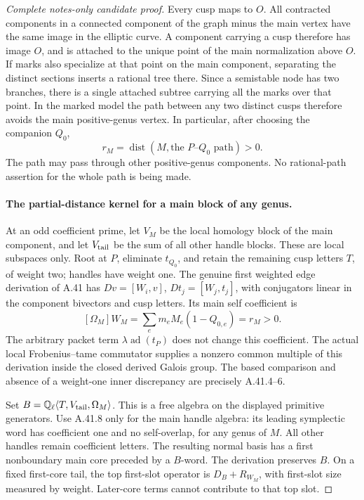 \begin{proof}[Complete notes-only candidate proof]
Every cusp maps to \(O\). All contracted components in a connected
component of the graph minus the main vertex have the same image
in the elliptic curve. A component carrying a cusp therefore has
image \(O\), and is attached to the unique point of the main
normalization above \(O\). If marks also specialize at that point
on the main component, separating the distinct sections inserts
a rational tree there. Since a semistable node has two branches,
there is a single attached subtree carrying all the marks over
that point. In the marked model the path between any two distinct
cusps therefore avoids the main positive-genus vertex. In
particular, after choosing the companion \(Q_0\),
\[
 r_M=\operatorname{dist}(M,\text{the }P\text{--}Q_0
                              \text{ path})>0.         \tag{A.82.15}
\]
The path may pass through other positive-genus components. No
rational-path assertion for the whole path is being made.

\paragraph{The partial-distance kernel for a main block of any genus.}
At an odd coefficient prime, let \(V_M\) be the local homology
block of the main component, and let \(V_{\rm tail}\) be the
sum of all other handle blocks. These are local subspaces only.
Root at \(P\), eliminate \(t_{Q_0}\), and retain the remaining
cusp letters \(T\), of weight two; handles have weight one.
The genuine first weighted edge derivation of A.41 has
\(Dv=[W_i,v]\), \(Dt_j=[W_j,t_j]\), with conjugators linear
in the component bivectors and cusp letters. Its main self
coefficient is
\[
            [\Omega_M]W_M
              =\sum_e m_e M_e(1-Q_{0,e})=r_M>0.       \tag{A.82.16}
\]
The arbitrary packet term \(\lambda\operatorname{ad}(t_P)\)
does not change this coefficient. The actual local Frobenius--tame
commutator supplies a nonzero common multiple of this derivation
inside the closed derived Galois group. The based comparison and
absence of a weight-one inner discrepancy are precisely A.41.4--6.

Set \(B=\mathbb Q_\ell\langle T,V_{\rm tail},\Omega_M\rangle\).
This is a free algebra on the displayed primitive generators.
Use A.41.8 only for the main handle algebra: its leading
symplectic word has coefficient one and no self-overlap, for
any genus of \(M\). All other handles remain coefficient letters.
The resulting normal basis has a first nonboundary main core
preceded by a \(B\)-word. The derivation preserves \(B\).
On a fixed first-core tail, the top first-slot operator is
\(D_B+R_{W_M}\), with first-slot size measured by weight.
Later-core terms cannot contribute to that top slot.


\end{proof}
